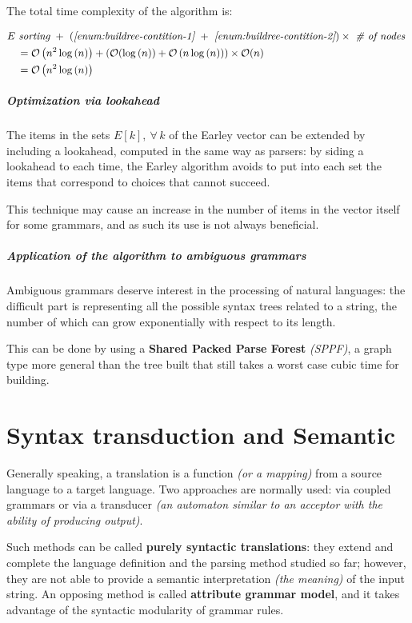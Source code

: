 \documentclass[english]{article}
\begin{document}
The total time complexity of the algorithm is:

\begin{align*}
   & E \ \textit{sorting} \ + \ \left(\textit{\ref{enum:buildree-contition-1}} \ + \ \textit{\ref{enum:buildree-contition-2}} \right) \times \ \textit{\# of nodes} \ \\
   & \quad = \mathcal{O}\left( n^2 \log{(n)} \right) + \left( \mathcal{O}(\log{(n)}) + \mathcal{O}\left( n \log{(n)} \right) \right) \times \mathcal{O}(n)            \\
   & \quad = \mathcal{O}\left( n^2 \log{(n)} \right)
\end{align*}

\subparagraph*{Optimization via lookahead}

The items in the sets \(E[k], \ \forall \, k\) of the Earley vector can be extended by including a lookahead, computed in the same way as \elro parsers:
by siding a lookahead to each time, the Earley algorithm avoids to put into each set the items that correspond to choices that cannot succeed.

This technique may cause an increase in the number of items in the vector itself for some grammars, and as such its use is not always beneficial.

\subparagraph*{Application of the algorithm to ambiguous grammars}

Ambiguous grammars deserve interest in the processing of natural languages:
the difficult part is representing all the possible syntax trees related to a string, the number of which can grow exponentially with respect to its length.

This can be done by using a \textbf{Shared Packed Parse Forest} \textit{(SPPF)}, a graph type more general than the tree built that still takes a worst case cubic time for building.

\clearpage

\section{Syntax transduction and Semantic}

Generally speaking, a translation is a function \textit{(or a mapping)} from a source language to a target language.
Two approaches are normally used:
via coupled grammars or via a transducer \textit{(an automaton similar to an acceptor with the ability of producing output)}.

Such methods can be called \textbf{purely syntactic translations}:
they extend and complete the language definition and the parsing method studied so far; however, they are not able to provide a semantic interpretation \textit{(the meaning)} of the input string.
An opposing method is called \textbf{attribute grammar model}, and it takes advantage of the syntactic modularity of grammar rules.
\end{document}
